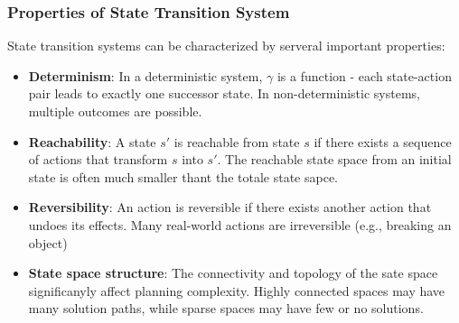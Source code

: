 \documentclass[a4paper]{article}
\theoremstyle{definition}
\begin{document}
\subsubsection{Properties of State Transition System}
State transition systems can be characterized by serveral important properties:
\begin{itemize}
    \item \textbf{Determinism}: In a deterministic system, \( \gamma \) is a function - each state-action pair leads to 
        exactly one successor state. In non-deterministic systems, multiple outcomes are possible.
    \item \textbf{Reachability}: A state \( s' \) is reachable from state \( s \) if there exists a sequence of actions 
        that transform \( s \) into \( s' \). The reachable state space from an initial state is often much smaller thant the totale
        state sapce.
    \item \textbf{Reversibility}: An action is reversible if there exists another action that undoes its effects. Many real-world
        actions are irreversible (e.g., breaking an object)
    \item \textbf{State space structure}: The connectivity and topology of the sate space significanyly affect planning complexity. Highly connected spaces 
        may have many solution paths, while sparse spaces may have few or no solutions.
\end{itemize}
\end{document}

